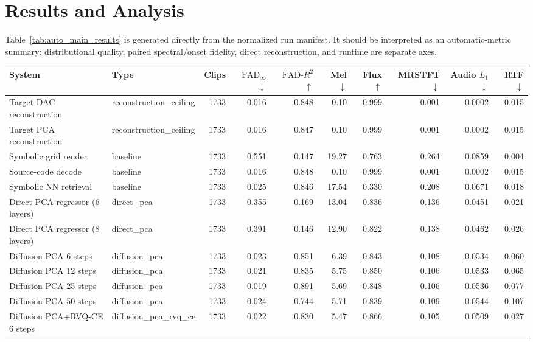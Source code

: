 \section{Results and Analysis}
Table~\ref{tab:auto_main_results} is generated directly from the normalized run manifest. It should be interpreted as an automatic-metric summary: distributional quality, paired spectral/onset fidelity, direct reconstruction, and runtime are separate axes.

\begin{table}[t]
\centering
\small
\setlength{\tabcolsep}{3pt}
\begin{tabular}{llrrrrrrrr}
\toprule
System & Type & Clips & $\mathrm{FAD}_{\infty}$ $\downarrow$ & $\mathrm{FAD}\text{-}R^2$ $\uparrow$ & Mel $\downarrow$ & Flux $\uparrow$ & MRSTFT $\downarrow$ & Audio $L_1$ $\downarrow$ & RTF $\downarrow$ \\
\midrule
Target DAC reconstruction & reconstruction\_ceiling & 1733 & 0.016 & 0.848 & 0.10 & 0.999 & 0.001 & 0.0002 & 0.015 \\
Target PCA reconstruction & reconstruction\_ceiling & 1733 & 0.016 & 0.847 & 0.10 & 0.999 & 0.001 & 0.0002 & 0.015 \\
Symbolic grid render & baseline & 1733 & 0.551 & 0.147 & 19.27 & 0.763 & 0.264 & 0.0859 & 0.004 \\
Source-code decode & baseline & 1733 & 0.016 & 0.848 & 0.10 & 0.999 & 0.001 & 0.0002 & 0.015 \\
Symbolic NN retrieval & baseline & 1733 & 0.025 & 0.846 & 17.54 & 0.330 & 0.208 & 0.0671 & 0.018 \\
Direct PCA regressor (6 layers) & direct\_pca & 1733 & 0.355 & 0.169 & 13.04 & 0.836 & 0.136 & 0.0451 & 0.021 \\
Direct PCA regressor (8 layers) & direct\_pca & 1733 & 0.391 & 0.146 & 12.90 & 0.822 & 0.138 & 0.0462 & 0.026 \\
Diffusion PCA 6 steps & diffusion\_pca & 1733 & 0.023 & 0.851 & 6.39 & 0.843 & 0.108 & 0.0534 & 0.060 \\
Diffusion PCA 12 steps & diffusion\_pca & 1733 & 0.021 & 0.835 & 5.75 & 0.850 & 0.106 & 0.0533 & 0.065 \\
Diffusion PCA 25 steps & diffusion\_pca & 1733 & 0.019 & 0.891 & 5.69 & 0.848 & 0.106 & 0.0536 & 0.077 \\
Diffusion PCA 50 steps & diffusion\_pca & 1733 & 0.024 & 0.744 & 5.71 & 0.839 & 0.109 & 0.0544 & 0.107 \\
Diffusion PCA+RVQ-CE 6 steps & diffusion\_pca\_rvq\_ce & 1733 & 0.022 & 0.830 & 5.47 & 0.866 & 0.105 & 0.0509 & 0.027 \\

\end{tabular}
\end{table}
